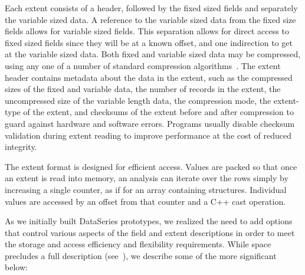 \documentclass{acm_proc_article-sp}
\begin{document}
Each extent consists of a header, followed by the fixed sized fields
and separately the variable sized data.  A reference to the variable
sized data from the fixed size fields allows for variable sized
fields.  This separation allows for direct access to fixed sized
fields since they will be at a known offset, and one indirection to
get at the variable sized data.  Both fixed and variable sized data
may be compressed, using any one of a number of standard compression
algorithms~\cite{BZIP,GZIP,LZF,LZO}.  The extent header contains
metadata about the data in the extent, such as the compressed sizes of
the fixed and variable data, the number of records in the extent, the
uncompressed size of the variable length data, the compression mode,
the extent-type of the extent, and checksums of the extent before and
after compression to guard against hardware and software errors.
Programs usually disable checksum validation during extent reading to
improve performance at the cost of reduced integrity.

The extent format is designed for efficient access. Values are packed
so that once an extent is read into memory, an analysis can iterate
over the rows simply by increasing a single counter, as if for an
array containing structures.  Individual values are accessed by an
offset from that counter and a C++ cast operation. 

As we initially built DataSeries prototypes, we realized the need to
add options that control various aspects of the field and extent
descriptions in order to meet the storage and access efficiency and
flexibility requirements.  While space precludes a full description
(see~\cite{DSTechnicalReportSnapshot}), we describe some of the more
significant below:
\end{document}
